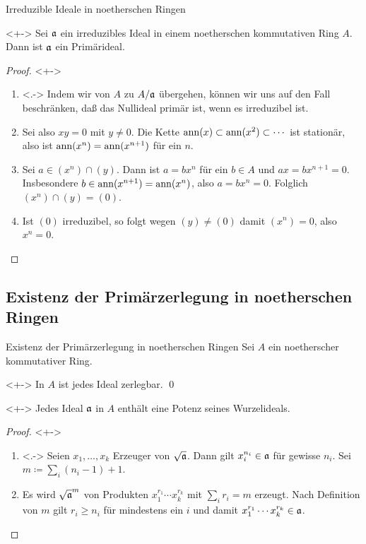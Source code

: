 \begin{frame}{Irreduzible Ideale in noetherschen Ringen}
	\begin{lemma}<+->
		\label{lem:lasker2}
		Sei \(\mathfrak{a}\) ein irreduzibles Ideal in einem noetherschen kommutativen
		Ring \(A\). Dann ist \(\mathfrak{a}\) ein Primärideal.
	\end{lemma}
	\begin{proof}<+->
		\begin{enumerate}[<+->]
		\item<.->
			Indem wir von \(A\) zu \(A/\mathfrak{a}\) übergehen, können wir uns auf den
			Fall beschränken, daß das Nullideal primär ist, wenn es irreduzibel ist.
		\item
			Sei also \(xy = 0\) mit \(y \neq 0\). Die Kette \(\operatorname{ann}(x) \subset \operatorname{ann}(x^2)
			\subset \dotsb\) ist stationär, also ist \(\operatorname{ann}(x^n) = \operatorname{ann}(x^{n + 1})\) für
			ein \(n\).
		\item
			Sei \(a \in (x^n) \cap (y)\). Dann ist \(a = b x^n\) für ein \(b \in A\) und
			\(a x = b x^{n + 1} = 0\). Insbesondere \(b \in \operatorname{ann}(x^{n + 1}) = \operatorname{ann}(x^{n})\),
			also \(a = b x^n = 0\). Folglich \((x^n) \cap (y) = (0)\).
		\item
			Ist \((0)\) irreduzibel, so folgt wegen \((y) \neq (0)\) damit \((x^n) = 0\),
			also \(x^n = 0\).
			\qedhere
		\end{enumerate}
	\end{proof}
\end{frame}

\subsection{Existenz der Primärzerlegung in noetherschen Ringen}

\begin{frame}{Existenz der Primärzerlegung in noetherschen Ringen}
	Sei \(A\) ein noetherscher kommutativer Ring.
	\begin{theorem}<+->
		In \(A\) ist jedes Ideal zerlegbar.
		\qed
	\end{theorem}
	\begin{proposition}<+->
		Jedes Ideal \(\mathfrak{a}\) in \(A\) enthält eine Potenz seines Wurzelideals.
	\end{proposition}
	\begin{proof}<+->
		\begin{enumerate}[<+->]
		\item<.->
			Seien \(x_1, \dotsc, x_k\) Erzeuger von \(\sqrt{\mathfrak{a}}\). Dann gilt
			\(x_i^{n_i} \in \mathfrak{a}\) für gewisse \(n_i\). Sei \(m \coloneqq
			\sum\limits_i (n_i - 1) + 1\).
		\item
			Es wird \(\sqrt{\mathfrak{a}}^m\) von Produkten \(x_1^{r_1} \dotsm x_k^{r_k}\) mit
			\(\sum\limits_i r_i = m\) erzeugt. Nach Definition von \(m\) gilt
			\(r_i \ge n_i\) für mindestens ein \(i\) und damit
			\(x_1^{r_1} \dotsm x_k^{r_k} \in \mathfrak{a}\).
			\qedhere
		\end{enumerate}
	\end{proof}
\end{frame}

